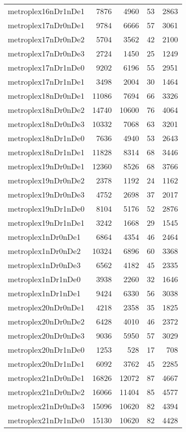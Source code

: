 \begin{tabular}{lrrrr}
metroplex16nDr1nDe1 & 7876 & 4960 & 53 & 2863 \\
metroplex17nDr0nDe1 & 9784 & 6666 & 57 & 3061 \\
metroplex17nDr0nDe2 & 5704 & 3562 & 42 & 2100 \\
metroplex17nDr0nDe3 & 2724 & 1450 & 25 & 1249 \\
metroplex17nDr1nDe0 & 9202 & 6196 & 55 & 2951 \\
metroplex17nDr1nDe1 & 3498 & 2004 & 30 & 1464 \\
metroplex18nDr0nDe1 & 11086 & 7694 & 66 & 3326 \\
metroplex18nDr0nDe2 & 14740 & 10600 & 76 & 4064 \\
metroplex18nDr0nDe3 & 10332 & 7068 & 63 & 3201 \\
metroplex18nDr1nDe0 & 7636 & 4940 & 53 & 2643 \\
metroplex18nDr1nDe1 & 11828 & 8314 & 68 & 3446 \\
metroplex19nDr0nDe1 & 12360 & 8526 & 68 & 3766 \\
metroplex19nDr0nDe2 & 2378 & 1192 & 24 & 1162 \\
metroplex19nDr0nDe3 & 4752 & 2698 & 37 & 2017 \\
metroplex19nDr1nDe0 & 8104 & 5176 & 52 & 2876 \\
metroplex19nDr1nDe1 & 3242 & 1668 & 29 & 1545 \\
metroplex1nDr0nDe1 & 6864 & 4354 & 46 & 2464 \\
metroplex1nDr0nDe2 & 10324 & 6896 & 60 & 3368 \\
metroplex1nDr0nDe3 & 6562 & 4182 & 45 & 2335 \\
metroplex1nDr1nDe0 & 3938 & 2260 & 32 & 1646 \\
metroplex1nDr1nDe1 & 9424 & 6330 & 56 & 3038 \\
metroplex20nDr0nDe1 & 4218 & 2358 & 35 & 1825 \\
metroplex20nDr0nDe2 & 6428 & 4010 & 46 & 2372 \\
metroplex20nDr0nDe3 & 9036 & 5950 & 57 & 3029 \\
metroplex20nDr1nDe0 & 1253 & 528 & 17 & 708 \\
metroplex20nDr1nDe1 & 6092 & 3762 & 45 & 2285 \\
metroplex21nDr0nDe1 & 16826 & 12072 & 87 & 4667 \\
metroplex21nDr0nDe2 & 16066 & 11404 & 85 & 4577 \\
metroplex21nDr0nDe3 & 15096 & 10620 & 82 & 4394 \\
metroplex21nDr1nDe0 & 15130 & 10620 & 82 & 4428 \\

\end{tabular}
